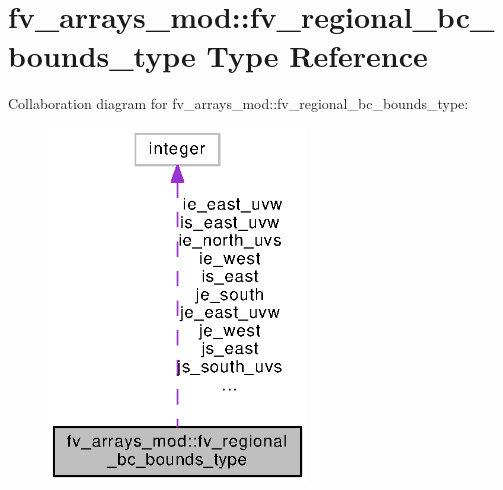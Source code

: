 \section{fv\-\_\-arrays\-\_\-mod\-:\-:fv\-\_\-regional\-\_\-bc\-\_\-bounds\-\_\-type Type Reference}
\label{structfv__arrays__mod_1_1fv__regional__bc__bounds__type}


Collaboration diagram for fv\-\_\-arrays\-\_\-mod\-:\-:fv\-\_\-regional\-\_\-bc\-\_\-bounds\-\_\-type\-:
\nopagebreak
\begin{figure}[H]
\begin{center}
\leavevmode
\includegraphics[width=194pt]{structfv__arrays__mod_1_1fv__regional__bc__bounds__type__coll__graph}
\end{center}
\end{figure}
